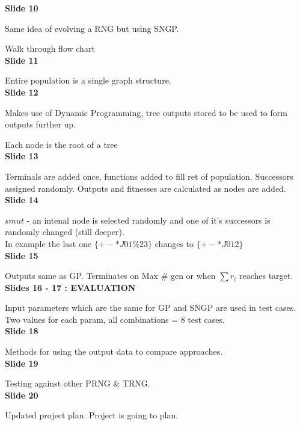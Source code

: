 \documentclass[a4paper,10.5pt]{article}
\begin{document}
\noindent \textbf{Slide 10}

Same idea of evolving a RNG but using SNGP.

Walk through flow chart\\

\noindent \textbf{Slide 11}

Entire population is a single graph structure.\\

\noindent \textbf{Slide 12}

Makes use of Dynamic Programming, tree outputs stored to be used to form outputs further up.

Each node is the root of a tree\\

\noindent \textbf{Slide 13}

Terminals are added once, functions added to fill ret of population. Successors assigned randomly. Outputs and fitnesses are calculated as nodes are added.\\

\noindent \textbf{Slide 14}

$smut$ - an intenal node is selected randomly and one of it's successors is randomly changed (still deeper).\\
In example the last one $\{+ - * J 0 1 \% 2 3\}$ changes to $\{+ - * J 0 1 2\}$\\
\newpage
\noindent \textbf{Slide 15}
 
Outputs same as GP. Terminates on Max \# gen or when $\sum r_i$ reaches target.\\

\noindent \textbf{Slides 16 - 17 : EVALUATION}

Input parameters which are the same for GP and SNGP are used in test cases. Two values for each param, all combinations = 8 test cases.\\

\noindent \textbf{Slide 18}

Methods for using the output data to compare approaches.\\

\noindent \textbf{Slide 19}

Testing against other PRNG \& TRNG.\\

\noindent \textbf{Slide 20}

Updated project plan. Project is going to plan.
\end{document}
